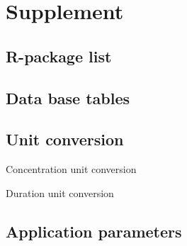 \section*{Supplement}
\subsection*{R-package list} %
\label{list:r-packages}

\pagebreak

\subsection*{Data base tables}


\subsection*{Unit conversion}

\begin{table}
    \caption{Concentration unit conversion}
    \label{tab:conv-concentration}
\end{table}

\begin{table}
    \caption{Duration unit conversion}
    \label{tab:conv-duration}
\end{table}

\subsection*{Application parameters}









